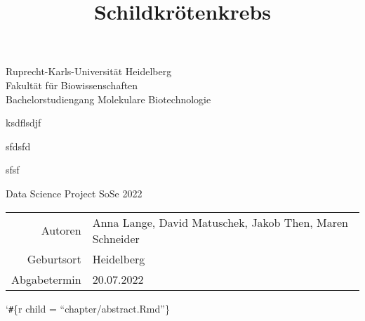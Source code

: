 \documentclass[
  parskip,
  oneside]{scrreprt}
\title{Schildkrötenkrebs}
\author{}
\date{\vspace{-2.5em}}
\begin{document}
\maketitle

\begin{titlepage}
\centering
    {\Large Ruprecht-Karls-Universität Heidelberg\\
        Fakultät für Biowissenschaften\\
        Bachelorstudiengang Molekulare Biotechnologie\\}

    {}
    {

        {\Huge ksdflsdjf}

        {\Huge sfdsfd}

        {\Huge sfsf}

    }

    {\Large Data Science Project SoSe 2022}


    {\Large
        \begin{tabular}{rl}
            Autoren & Anna Lange, David Matuschek, Jakob Then, Maren Schneider\\
            Geburtsort & Heidelberg\\
            Abgabetermin &20.07.2022\\
        \end{tabular}
    }


\end{titlepage}

\tableofcontents

`\texttt{\#}\{r child = ``chapter/abstract.Rmd''\}
\end{document}
